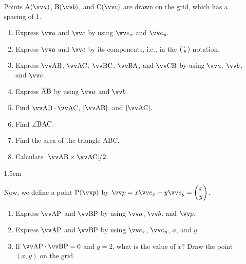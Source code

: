 \documentclass[11pt,pdfa,lastpage]{MishoNote}
\begin{document}
\begin{problems}
\Problem[S] Points $\posvec Aa$, $\posvec Bb$, and $\posvec Cc$ are drawn on the grid, which has a spacing of 1.

\medskip

\par
\noindent\begin{minipage}[b]{0.45\textwidth}
  \begin{enumerate}
    \item Express $\vc a$ and $\vc c$ by using $\vvex$ and $\vvey$.
    \item Express $\vc a$ and $\vc c$ by its components, i.e., in the $\left(\begin{smallmatrix}x\\y\end{smallmatrix}\right)$ notation.
    \item Express $\vvv{AB}$, $\vvv{AC}$, $\vvv{BC}$, $\vvv{BA}$, and $\vvv{CB}$ by using $\vc a$, $\vc b$, and $\vc c$.
    \item Express $\overline{\mathrm{AB}}$ by using $\vc a$ and $\vc b$.
    \item Find $\vvv{AB}\cdot\vvv{AC}$, $|\vvv{AB}|$, and $|\vvv{AC}|$.
    \item Find $\angle{\mathrm{BAC}}$.
    \item Find the area of the triangle ABC.
    \item Calculate $|\vvv{AB}\times\vvv{AC}|/2$.
  \end{enumerate}
\end{minipage}\kern1.5em
\begin{minipage}[b]{0.44\textwidth}
  \usebox{\VectorSetC} \par\vspace{2em}
\end{minipage}

\smallskip

Now, we define a point $\posvec Pp$ by $\vc p=x\vvex+y\vvey=\pmat{x\\y}$.
\begin{enumerate}[start=9]
\item Express $\vvv{AP}$ and $\vvv{BP}$ by using $\vc a$, $\vc b$, and $\vc p$.
\item Express $\vvv{AP}$ and $\vvv{BP}$ by using $\vvex$, $\vvey$, $x$, and $y$.
\item If $\vvv{AP}\cdot\vvv{BP}=0$ and $y=2$, what is the value of $x$? Draw the point $(x,y)$ on the grid.
\end{enumerate}


\end{problems}
\end{document}
